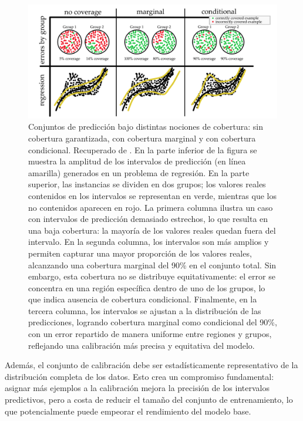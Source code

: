 \begin{figure}[htbp]
    \centering
    \includegraphics[width=\textwidth]{capitulos/cap_02/imagenes/coverage_types.png}
    \caption[
        Conjuntos de predicción bajo distintas nociones de cobertura: sin cobertura garantizada, con cobertura marginal y con cobertura condicional. Recuperado de \cite{angelopoulos2021}.
    ]{
        Conjuntos de predicción bajo distintas nociones de cobertura: sin cobertura garantizada, con cobertura marginal y con cobertura condicional. Recuperado de \cite{angelopoulos2021}.
        En la parte inferior de la figura se muestra la amplitud de los intervalos de predicción (en línea amarilla) generados en un problema de regresión. En la parte superior, las instancias se dividen en dos grupos; los valores reales contenidos en los intervalos se representan en verde, mientras que los no contenidos aparecen en rojo.
        La primera columna ilustra un caso con intervalos de predicción demasiado estrechos, lo que resulta en una baja cobertura: la mayoría de los valores reales quedan fuera del intervalo.
        En la segunda columna, los intervalos son más amplios y permiten capturar una mayor proporción de los valores reales, alcanzando una cobertura marginal del 90\% en el conjunto total. Sin embargo, esta cobertura no se distribuye equitativamente: el error se concentra en una región específica dentro de uno de los grupos, lo que indica ausencia de cobertura condicional.
        Finalmente, en la tercera columna, los intervalos se ajustan a la distribución de las predicciones, logrando cobertura marginal como condicional del 90\%, con un error repartido de manera uniforme entre regiones y grupos, reflejando una calibración más precisa y equitativa del modelo.
    } 
    \label{fig:coverage}
\end{figure}


Además, el conjunto de calibración debe ser estadísticamente representativo de la distribución completa de los datos. Esto crea un compromiso fundamental: asignar más ejemplos a la calibración mejora la precisión de los intervalos predictivos, pero a costa de reducir el tamaño del conjunto de entrenamiento, lo que potencialmente puede empeorar el rendimiento del modelo base.

